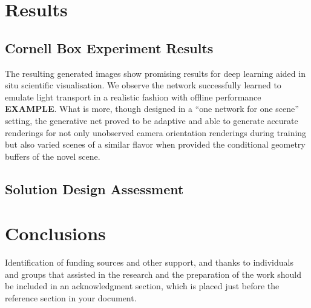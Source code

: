 \documentclass[sigconf]{acmart}%
\begin{document}
\section{Results}
\subsection{Cornell Box Experiment Results}
The resulting generated images show promising results for deep learning aided in situ scientific visualisation. We observe the network successfully learned to emulate light transport in a realistic fashion with offline performance {\bf EXAMPLE}. What is more, though designed in a ``one network for one scene'' setting, the generative net proved to be adaptive and able to generate accurate renderings for not only unobserved camera orientation renderings during training but also varied scenes of a similar flavor when provided the conditional geometry buffers of the novel scene. 

\subsection{Solution Design Assessment}
\section{Conclusions}



\begin{acks}
Identification of funding sources and other support, and thanks to
individuals and groups that assisted in the research and the
preparation of the work should be included in an acknowledgment
section, which is placed just before the reference section in your
document.
\end{acks}




\end{document}
